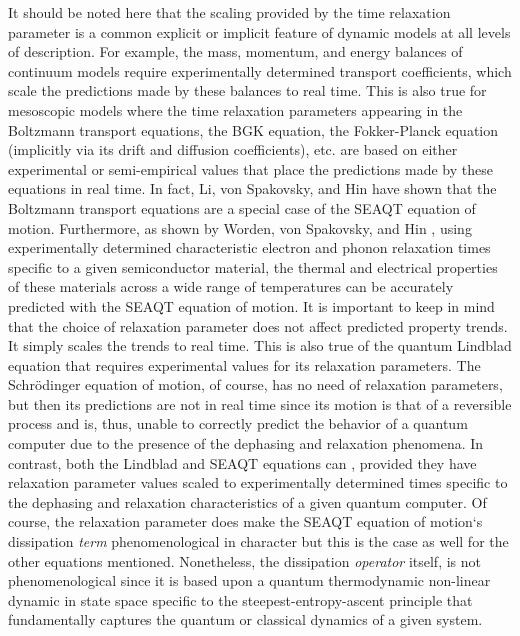 \documentclass[
journal=jcisd8, %
manuscript=article,
layout=twocolumn   %
]{achemso}
\begin{document}
It should be noted here that the scaling provided by the time relaxation parameter is a common explicit or implicit feature of dynamic models at all levels of description. For example, the mass, momentum, and energy balances of continuum models require experimentally determined transport coefficients, which scale the predictions made by these balances to real time. This is also true for mesoscopic models where the time relaxation parameters appearing in the Boltzmann transport equations, the BGK equation, the Fokker-Planck equation (implicitly via its drift and diffusion coefficients), etc. are based on either experimental or semi-empirical values that place the predictions made by these equations in real time. In fact, Li, von Spakovsky, and Hin \cite{Li2018steepest} have shown that the Boltzmann transport equations are a special case of the SEAQT equation of motion. Furthermore, as shown by Worden, von Spakovsky, and Hin \cite{worden2023}, using experimentally determined characteristic electron and phonon relaxation times specific to a given semiconductor material, the thermal and electrical properties of these materials across a wide range of temperatures can be accurately predicted with the SEAQT equation of motion. It is important to keep in mind that the choice of relaxation parameter does not affect  predicted property trends. It simply scales the trends to real time. This is also true of the quantum Lindblad equation that requires experimental values for its relaxation parameters. The Schrödinger equation of motion, of course, has no need of relaxation parameters, but then its predictions are not in real time since its motion is that of a reversible process and is, thus, unable to correctly predict the behavior of a quantum computer due to the presence of the dephasing and relaxation phenomena. In contrast, both the Lindblad and SEAQT equations can \cite{jhon2020,jhon2022,cano2015steepest}, provided they have relaxation parameter values scaled to experimentally determined times specific to the dephasing and relaxation characteristics of a given quantum computer. Of course, the relaxation parameter does make the SEAQT equation of motion`s dissipation {\em term} phenomenological in character but this is the case as well for the other equations mentioned. Nonetheless, the dissipation {\em operator} itself, is not phenomenological since it is based upon a quantum thermodynamic non-linear dynamic in state space specific to the steepest-entropy-ascent principle that fundamentally captures the quantum or classical dynamics of a given system. 
\end{document}
